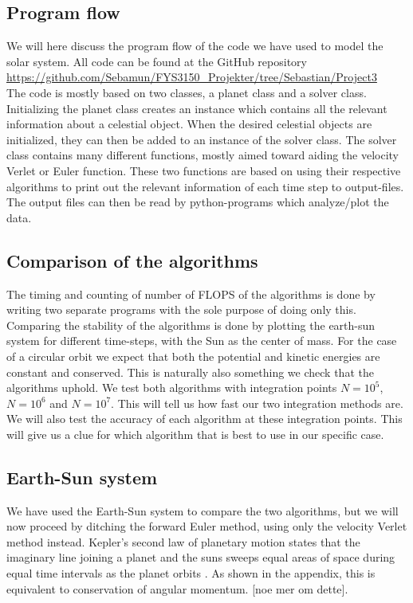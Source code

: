 \documentclass{article}
\begin{document}
\begin{multicols}{2}
\subsection{Program flow}

We will here discuss the program flow of the code we have used to model the solar system. All code can be found at the GitHub repository \\
\url{https://github.com/Sebamun/FYS3150_Projekter/tree/Sebastian/Project3}  \\ The code is mostly based on two classes, a planet class and a solver class. Initializing the planet class creates an instance which contains all the relevant information about a celestial object. When the desired celestial objects are initialized, they can then be added to an instance of the solver class. The solver class contains many different functions, mostly aimed toward aiding the velocity Verlet or Euler function. These two functions are based on using their respective algorithms to print out the relevant information of each time step to output-files. The output files can then be read by python-programs which analyze/plot the data.

\subsection{Comparison of the algorithms}
The timing and counting of number of FLOPS of the algorithms is done by writing two separate programs with the sole purpose of doing only this. Comparing the stability of the algorithms is done by plotting the earth-sun system for different time-steps, with the Sun as the center of mass. For the case of a circular orbit we expect that both the potential and kinetic energies are constant and conserved. This is naturally also something we check that the algorithms uphold. We test both algorithms with integration points $N=10^5$, $N=10^6$ and $N=10^7$. This will tell us how fast our two integration methods are. We will also test the accuracy of each algorithm at these integration points. This will give us a clue for which algorithm that is best to use in our specific case. 

\subsection{Earth-Sun system}

We have used the Earth-Sun system to compare the two algorithms, but we will now proceed by ditching the forward Euler method, using only the velocity Verlet method instead. Kepler's second law of planetary motion states that the imaginary line joining a planet and the suns sweeps equal areas of space during equal time intervals as the planet orbits \cite{94}. As shown in the appendix, this is equivalent to conservation of angular momentum. [noe mer om dette]. 


\end{multicols}
\end{document}
